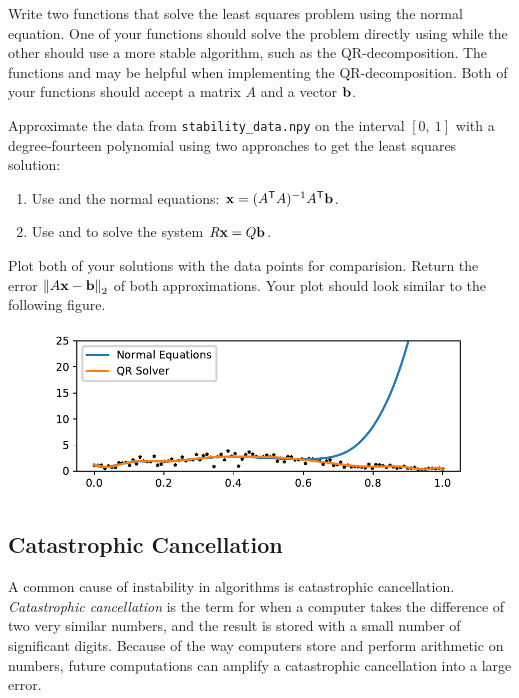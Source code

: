 \begin{problem}\label{problem:lstsqr}
Write two functions that solve the least squares problem using the normal equation.
One of your functions should solve the problem directly using  while the other should use a more stable algorithm, such as the QR-decomposition.
The functions  and  may be helpful when implementing the QR-decomposition.
Both of your functions should accept a matrix $A$ and a vector $\mathbf{b}$.

Approximate the data from \texttt{stability\_data.npy} on the interval $[0,\ 1]$ with a degree-fourteen polynomial using two approaches to get the least squares solution:
\begin{enumerate}
\item Use  and the normal equations: $\mathbf{x} = (A^{\mathsf T} A)^{-1}A^{\mathsf T} \mathbf{b}$.
\item Use  and  to solve the system $R\mathbf{x} = Q\mathbf{b}$.
\end{enumerate}
Plot both of your solutions with the data points for comparision.
Return the error $\left\lVert A\mathbf{x}-\mathbf{b}\right\rVert_2$ of both approximations.
Your plot should look similar to the following figure.

\begin{figure}[H] %
    \centering
    \includegraphics[width=.7\textwidth]{figures/lstsq_stability.pdf}
\end{figure}

\end{problem}

\subsection*{Catastrophic Cancellation} %

A common cause of instability in algorithms is catastrophic cancellation.
\emph{Catastrophic cancellation} is the term for when a computer takes the difference of two very similar numbers, and the result is stored with a small number of significant digits.
Because of the way computers store and perform arithmetic on numbers, future computations can amplify a catastrophic cancellation into a large error.

